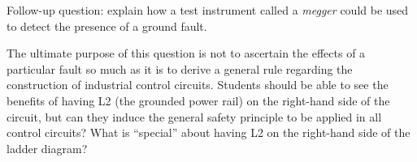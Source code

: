 \vskip 10pt

Follow-up question: explain how a test instrument called a {\it megger} could be used to detect the presence of a ground fault.







The ultimate purpose of this question is not to ascertain the effects of a particular fault so much as it is to derive a general rule regarding the construction of industrial control circuits.  Students should be able to see the benefits of having L2 (the grounded power rail) on the right-hand side of the circuit, but can they induce the general safety principle to be applied in all control circuits?  What is ``special'' about having L2 on the right-hand side of the ladder diagram?




